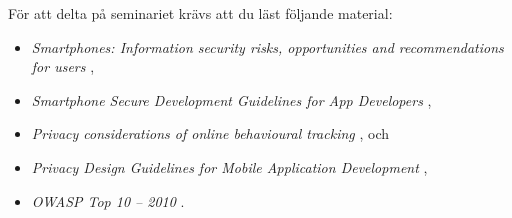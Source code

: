 För att delta på seminariet krävs att du läst följande material:
\begin{itemize}
	\item \emph{Smartphones: Information security risks, opportunities and 
		recommendations for users} \cite{enisa2010sis},
	\item \emph{Smartphone Secure Development Guidelines for App Developers} 
		\cite{enisa2011ssd},
	\item \emph{Privacy considerations of online behavioural tracking} 
		\cite{enisa2012pco}, och
	\item \emph{Privacy Design Guidelines for Mobile Application Development} 
		\cite{GSMA2012pdg},
	\item \emph{OWASP Top 10 -- 2010} \cite{owasp2010ott}.
\end{itemize}
